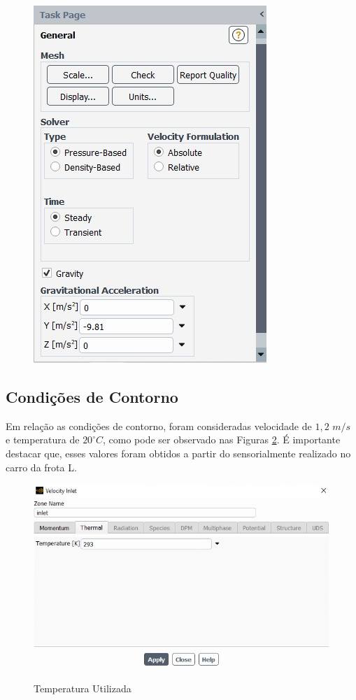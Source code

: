 \documentclass[acronym,symbols,table]{fei}
\begin{document}
\begin{figure}[!htp]
\begin{minipage}{0.5\textwidth}
		\includegraphics[width=0.8\linewidth]{Imagens/gravidade.jpeg}
		\label{fig:gravidade}
	\end{minipage}
\end{figure}


\subsection{Condições de Contorno}

Em relação as condições de contorno, foram consideradas velocidade de $1,2$ $m/s$ e temperatura de $20 ^\circ C$, como pode ser observado nas Figuras \ref{fig:temperatura_utilizada}. É importante destacar que, esses valores foram obtidos a partir do sensorialmente realizado no carro da frota L.

\begin{figure}[!htb]
    \centering
    \caption{Temperatura Utilizada}
    \includegraphics[width=0.8\linewidth]{Imagens/temperatura.png}
    \label{fig:temperatura_utilizada}
\end{figure}
\end{document}
